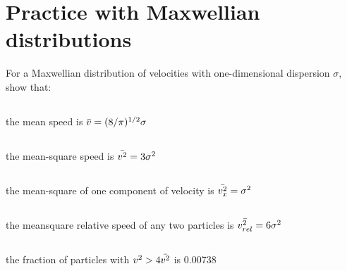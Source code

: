 \section{Practice with Maxwellian \\distributions}

For a Maxwellian distribution of velocities with one-dimensional dispersion $\sigma$,
show that:

\subsection{}
the mean speed is $\Bar{v}=(8/\pi)^{1/2}\sigma$

\subsection{}
the mean-square speed is $\Bar{v^2}=3\sigma^2$

\subsection{}
the mean-square of one component of velocity is $\Bar{v^2_x}=\sigma^2$

\subsection{}
the mean\-square relative speed of any two particles is $\Bar{v^2_{rel}}=6\sigma^2$

\subsection{}
the fraction of particles with $v^2>4\Bar{v^2}$ is 0.00738